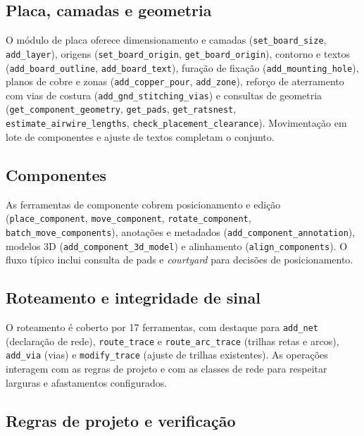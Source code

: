 \subsection{Placa, camadas e geometria}

O módulo de placa oferece dimensionamento e camadas (\texttt{set\_board\_size},
\texttt{add\_layer}), origens (\texttt{set\_board\_origin},
\texttt{get\_board\_origin}), contorno e textos
(\texttt{add\_board\_outline}, \texttt{add\_board\_text}), furação de fixação
(\texttt{add\_mounting\_hole}), planos de cobre e zonas
(\texttt{add\_copper\_pour}, \texttt{add\_zone}), reforço de aterramento com
vias de costura (\texttt{add\_gnd\_stitching\_vias}) e consultas de geometria
(\texttt{get\_component\_geometry}, \texttt{get\_pads},
\texttt{get\_ratsnest}, \texttt{estimate\_airwire\_lengths},
\texttt{check\_placement\_clearance}). Movimentação em lote de componentes e
ajuste de textos completam o conjunto.

\subsection{Componentes}

As ferramentas de componente cobrem posicionamento e edição
(\texttt{place\_component}, \texttt{move\_component},
\texttt{rotate\_component}, \texttt{batch\_move\_components}), anotações e
metadados (\texttt{add\_component\_annotation}), modelos 3D
(\texttt{add\_component\_3d\_model}) e alinhamento
(\texttt{align\_components}). O fluxo típico inclui consulta de pads e
\emph{courtyard} para decisões de posicionamento.

\subsection{Roteamento e integridade de sinal}

O roteamento é coberto por 17 ferramentas, com destaque para
\texttt{add\_net} (declaração de rede), \texttt{route\_trace} e
\texttt{route\_arc\_trace} (trilhas retas e arcos), \texttt{add\_via} (vias) e
\texttt{modify\_trace} (ajuste de trilhas existentes). As operações interagem
com as regras de projeto e com as classes de rede para respeitar larguras e
afastamentos configurados.

\subsection{Regras de projeto e verificação}

